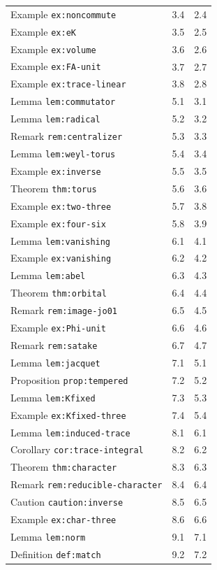 \documentclass[12pt,letterpaper]{article}
\begin{document}
{\begin{longtable}{@{}lll@{}}
Example \texttt{ex:noncommute} & 3.4 & 2.4\\
Example \texttt{ex:eK} & 3.5 & 2.5\\
Example \texttt{ex:volume} & 3.6 & 2.6\\
Example \texttt{ex:FA-unit} & 3.7 & 2.7\\
Example \texttt{ex:trace-linear} & 3.8 & 2.8\\
Lemma \texttt{lem:commutator} & 5.1 & 3.1\\
Lemma \texttt{lem:radical} & 5.2 & 3.2\\
Remark \texttt{rem:centralizer} & 5.3 & 3.3\\
Lemma \texttt{lem:weyl-torus} & 5.4 & 3.4\\
Example \texttt{ex:inverse} & 5.5 & 3.5\\
Theorem \texttt{thm:torus} & 5.6 & 3.6\\
Example \texttt{ex:two-three} & 5.7 & 3.8\\
Example \texttt{ex:four-six} & 5.8 & 3.9\\
Lemma \texttt{lem:vanishing} & 6.1 & 4.1\\
Example \texttt{ex:vanishing} & 6.2 & 4.2\\
Lemma \texttt{lem:abel} & 6.3 & 4.3\\
Theorem \texttt{thm:orbital} & 6.4 & 4.4\\
Remark \texttt{rem:image-jo01} & 6.5 & 4.5\\
Example \texttt{ex:Phi-unit} & 6.6 & 4.6\\
Remark \texttt{rem:satake} & 6.7 & 4.7\\
Lemma \texttt{lem:jacquet} & 7.1 & 5.1\\
Proposition \texttt{prop:tempered} & 7.2 & 5.2\\
Lemma \texttt{lem:Kfixed} & 7.3 & 5.3\\
Example \texttt{ex:Kfixed-three} & 7.4 & 5.4\\
Lemma \texttt{lem:induced-trace} & 8.1 & 6.1\\
Corollary \texttt{cor:trace-integral} & 8.2 & 6.2\\
Theorem \texttt{thm:character} & 8.3 & 6.3\\
Remark \texttt{rem:reducible-character} & 8.4 & 6.4\\
Caution \texttt{caution:inverse} & 8.5 & 6.5\\
Example \texttt{ex:char-three} & 8.6 & 6.6\\
Lemma \texttt{lem:norm} & 9.1 & 7.1\\
Definition \texttt{def:match} & 9.2 & 7.2\\

\end{longtable}}
\end{document}
